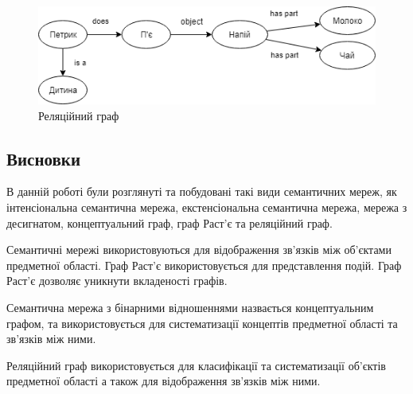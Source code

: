 \begin{figure}[H]
    \centering
        \includegraphics[width=\linewidth]{semantic_rel}
    \caption{Реляційний граф}
    \label{fig:semantic_rel}
\end{figure}

\subsection*{Висновки}
В данній роботі були розглянуті та побудовані такі види семантичних мереж, як інтенсіональна семантична мережа, екстенсіональна семантична мережа, мережа з десигнатом, концептуальний граф, граф Раст'є та реляційний граф.

Семантичні мережі використовуються для відображення зв'язків між об'єктами предметної області.
Граф Раст'є використовується для представлення подій.
Граф Раст'є дозволяє уникнути вкладеності графів.

Семантична мережа з бінарними відношеннями назвається концептуальним графом, та використовується для систематизації концептів предметної області та зв’язків між ними.

Реляційний граф використовується для класифікації та систематизації об’єктів предметної області а також для відображення зв’язків між ними.


